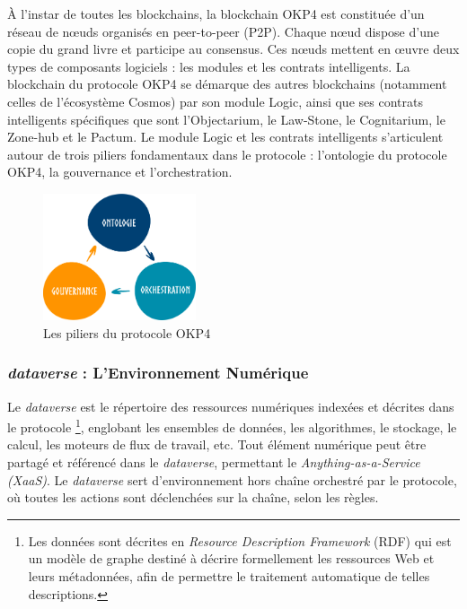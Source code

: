 À l'instar de toutes les blockchains, la blockchain OKP4 est constituée d'un réseau de nœuds organisés en peer-to-peer (P2P). Chaque nœud dispose d'une copie du grand livre et participe au consensus. Ces nœuds mettent en œuvre deux types de composants logiciels : les modules et les contrats intelligents. La blockchain du protocole OKP4 se démarque des autres blockchains (notamment celles de l'écosystème Cosmos) par son module Logic, ainsi que ses contrats intelligents spécifiques que sont l'Objectarium, le Law-Stone, le Cognitarium, le Zone-hub et le Pactum. Le module Logic et les contrats intelligents s'articulent autour de trois piliers fondamentaux dans le protocole : l'ontologie du protocole OKP4, la gouvernance et l'orchestration.

\begin{figure}[h]
    \centering
    \includegraphics[width=0.4\textwidth]{ILLUSTRATIONS/piliers.png}
    \caption{Les piliers du protocole OKP4}
    \label{fig:piliers_protocole}
\end{figure}


\subsubsection{\textit{dataverse} : L'Environnement Numérique} \label{subsubsec:aperçu_dataverse}


Le \textit{dataverse} est le répertoire des ressources numériques indexées et décrites dans le protocole \footnote{Les données sont décrites en \textit{Resource Description Framework} (RDF) qui est un modèle de graphe destiné à décrire formellement les ressources Web et leurs métadonnées, afin de permettre le traitement automatique de telles descriptions.}, englobant les ensembles de données, les algorithmes, le stockage, le calcul, les moteurs de flux de travail, etc. Tout élément numérique peut être partagé et référencé dans le \textit{dataverse}, permettant le \textit{Anything-as-a-Service (XaaS)}. Le \textit{dataverse} sert d'environnement hors chaîne orchestré par le protocole, où toutes les actions sont déclenchées sur la chaîne, selon les règles.

